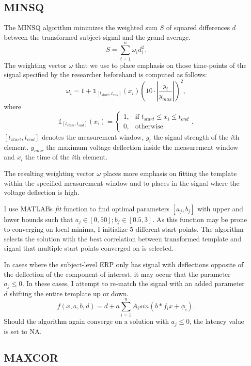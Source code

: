 \documentclass[
  man]{apa7}
\begin{document}
\hypertarget{minsq}{%
\subsection{MINSQ}\label{minsq}}

The MINSQ algorithm minimizes the weighted sum \(S\) of squared differences \(d\) between the transformed subject signal and the grand average.
\[S = \sum_{i = 1}^{n}\omega_{i}d_{i}^2.\]
The weighting vector \(\omega\) that we use to place emphasis on those time-points of the signal specified by the researcher beforehand is computed as follows:
\[\omega_i = 1+\mathbb{1}_{[t_{start}, t_{end}]}(x_i)(10 \cdot |\frac{y_i}{y_{max}}|)^2,\]
where
\[\mathbb{1}_{[t_{start}, t_{end}]}(x_i) = \begin{cases} 1, & \text{if $t_{start} \le x_i \le t_{end}$} \\ 0, & \text{otherwise}\end{cases}.\]
\([t_{start}, t_{end}]\) denotes the measurement window, \(y_{i}\) the signal strength of the \(i\)th element, \(y_{max}\) the maximum voltage deflection inside the measurement window and \(x_i\) the time of the \(i\)th element.

The resulting weighting vector \(\omega\) places more emphasis on fitting the template within the specified measurement window and to places in the signal where the voltage deflection is high.

I use MATLABs \emph{fit} function to find optimal parameters \([a_j, b_j]\) with upper and lower bounds such that \(a_j \in [0, 50]; b_j \in [0.5, 3]\). As this function may be prone to converging on local minima, I initialize 5 different start points. The algorithm selects the solution with the best correlation between transformed template and signal that multiple start points converged on is selected.

In cases where the subject-level ERP only has signal with deflections opposite of the deflection of the component of interest, it may occur that the parameter \(a_j \le 0\). In these cases, I attempt to re-match the signal with an added parameter \(d\) shifting the entire template up or down.
\[f(x, a,b, d) = d +a\sum_{i = 1}^{n} A_isin(b*f_ix + \phi_i).\]
Should the algorithm again converge on a solution with \(a_j \le 0\), the latency value is set to NA.

\hypertarget{maxcor}{%
\subsection{MAXCOR}\label{maxcor}}
\end{document}
